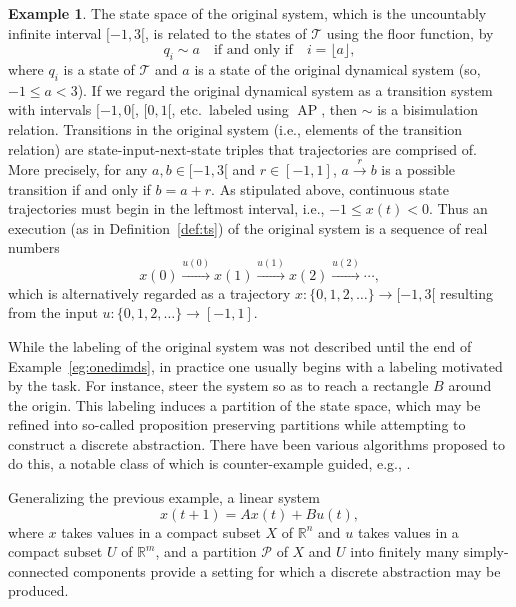 \documentclass{amsart}
\DeclareMathOperator{\ap}{AP}
\theoremstyle{plain}
\theoremstyle{definition}
\theoremstyle{definition}
\newtheorem{examp}{Example}
\begin{document}
\begin{examp}
The state space of the original system, which is the uncountably infinite
interval $[-1,3[$, is related to the states of $\mathcal{T}$ using the floor function, by
\[
q_i \sim a \quad\textrm{if and only if}\quad i = \lfloor a \rfloor ,
\]
where $q_i$ is a state of $\mathcal{T}$ and $a$ is a state of the original
dynamical system (so, $-1\leq a < 3$).  If we regard the original dynamical
system as a transition system with intervals $[-1,0[$, $[0,1[$, etc.\ labeled
using $\ap$, then $\sim$ is a bisimulation relation.  Transitions in the 
original system (i.e., elements of the transition relation) are
state-input-next-state triples that trajectories are comprised of.  More
precisely, for any $a,b\in [-1,3[$ and $r\in [-1,1]$,
$a\overset{r}{\longrightarrow} b$ is a possible transition if and only if $b = a+r$.
As stipulated above, continuous state trajectories must begin in the leftmost
interval, i.e., $-1 \leq x(t) < 0$.  Thus an execution (as in
Definition~\ref{def:ts}) of the original system is a sequence of real numbers
\[
x(0)\overset{u(0)}{\longrightarrow}x(1)\overset{u(1)}{\longrightarrow}x(2)\overset{u(2)}{\longrightarrow}\cdots ,
\]
which is alternatively regarded as a trajectory $x:\{0,1,2,\ldots\}\rightarrow
[-1,3[$ resulting from the input $u:\{0,1,2,\ldots\}\rightarrow [-1,1]$.
\end{examp}
While the labeling of the original system was not described until the end of
Example~\ref{eg:onedimds}, in practice one usually begins with a labeling
motivated by the task.  For instance, steer the system so as to reach a
rectangle $B$ around the origin.  This labeling induces a partition of the state
space, which may be refined into so-called proposition preserving partitions
while attempting to construct a discrete abstraction.  There have been various
algorithms proposed to do this, a notable class of which is counter-example
guided, e.g., \cite{AlurDI2003}.

Generalizing the previous example, a linear system
\begin{equation}
x(t+1) = Ax(t) + Bu(t) ,
\end{equation}
where $x$ takes values in a compact subset $X$ of $\mathbb{R}^n$ and $u$ takes
values in a compact subset $U$ of $\mathbb{R}^m$, and a partition $\mathcal{P}$
of $X$ and $U$ into finitely many simply-connected components provide a setting
for which a discrete abstraction may be produced.


\end{document}
